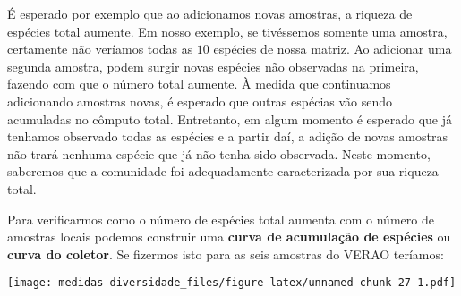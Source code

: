 \documentclass[
]{book}
\newenvironment{Shaded}{\begin{snugshade}}{\end{snugshade}}
\newcommand{\AttributeTok}[1]{\textcolor[rgb]{0.77,0.63,0.00}{#1}}
\newcommand{\DecValTok}[1]{\textcolor[rgb]{0.00,0.00,0.81}{#1}}
\newcommand{\FunctionTok}[1]{\textcolor[rgb]{0.00,0.00,0.00}{#1}}
\newcommand{\NormalTok}[1]{#1}
\newcommand{\OtherTok}[1]{\textcolor[rgb]{0.56,0.35,0.01}{#1}}
\newcommand{\SpecialCharTok}[1]{\textcolor[rgb]{0.00,0.00,0.00}{#1}}
\newcommand{\StringTok}[1]{\textcolor[rgb]{0.31,0.60,0.02}{#1}}
\begin{document}
É esperado por exemplo que ao adicionamos novas amostras, a riqueza de espécies total aumente. Em nosso exemplo, se tivéssemos somente uma amostra, certamente não veríamos todas as \(10\) espécies de nossa matriz. Ao adicionar uma segunda amostra, podem surgir novas espécies não observadas na primeira, fazendo com que o número total aumente. À medida que continuamos adicionando amostras novas, é esperado que outras espécias vão sendo acumuladas no cômputo total. Entretanto, em algum momento é esperado que já tenhamos observado todas as espécies e a partir daí, a adição de novas amostras não trará nenhuma espécie que já não tenha sido observada. Neste momento, saberemos que a comunidade foi adequadamente caracterizada por sua riqueza total.

Para verificarmos como o número de espécies total aumenta com o número de amostras locais podemos construir uma \textbf{curva de acumulação de espécies} ou \textbf{curva do coletor}. Se fizermos isto para as seis amostras do VERAO teríamos:

\begin{Shaded}
\end{Shaded}

\texttt{[image: medidas-diversidade\_files/figure-latex/unnamed-chunk-27-1.pdf]}
\end{document}
